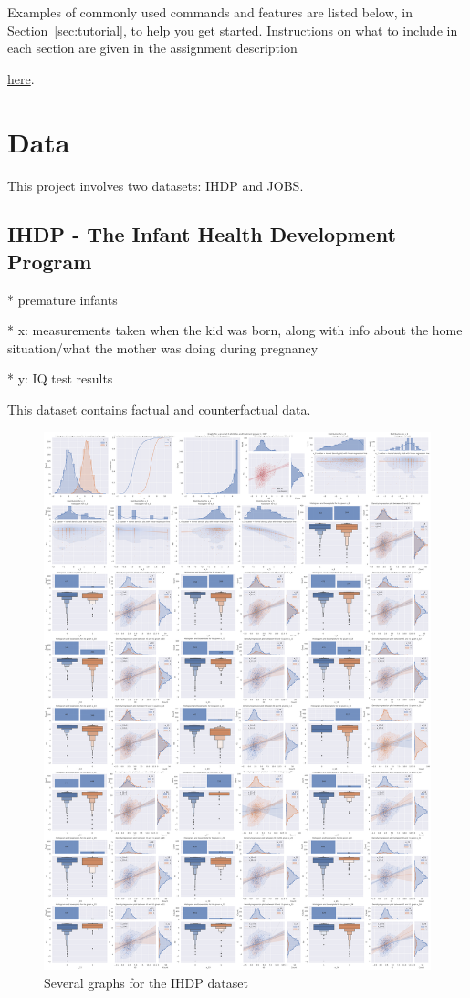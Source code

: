 \documentclass{article}
\begin{document}
Examples of commonly used commands and features are listed below, in
Section~\ref{sec:tutorial}, to help you get started.
Instructions on what to include in each section are given in the assignment description

\href{https://moodle.essex.ac.uk/draftfile.php/196919/user/draft/666046553/2021_CE888_Assignment_1.pdf}{here}.

\section{Data}

This project involves two datasets: IHDP\cite{Gross1993}\cite{BROOKSGUNN1992350} and JOBS\cite{JOBS_LaLonde}.

\subsection{IHDP - The Infant Health Development Program}

* premature infants

* x: measurements taken when the kid was born, along with info about the home situation/what the mother was doing during pregnancy

* y: IQ test results

This dataset contains factual and counterfactual data.

\begin{figure}[tb]
\centering
\includegraphics[width=1\textwidth]{project/data/ihdp_graphs.pdf}
\caption{\label{fig:ihdpgraphs}Several graphs for the IHDP dataset}
\end{figure}
\end{document}

